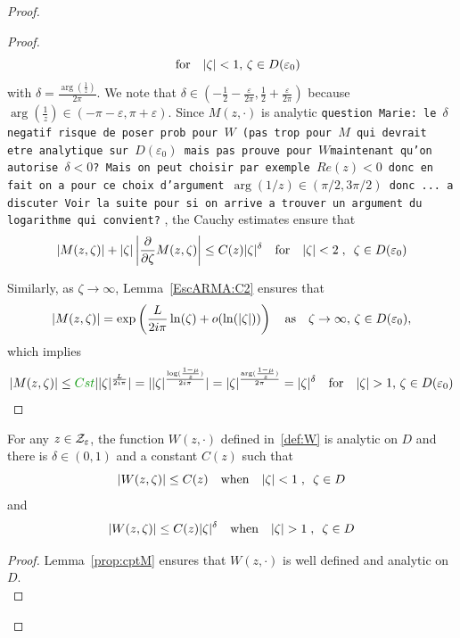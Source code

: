\documentclass[11pt]{amsart}
\newcommand{\MD}{\color{vert}}
\newcommand{\ep}{\varepsilon}
\newcommand{\f}{\frac}
\begin{document}
\begin{proof}
\begin{proof}
$$\quad \text{for} \quad  \vert \zeta \vert < 1,\, \zeta \in D(\varepsilon_0)$$ with 
 $\delta = \frac{\arg(\frac{1}{z})}{2\pi}$. We note that {\MD $\delta \in (-\f{1}{2}-\f{\ep}{2\pi},\f{1}{2}+\f{\ep}{2\pi})$ because $\arg(\frac{1}{z}) \in (-\pi-\ep, \pi+\ep)$}.
Since {\MD $M(z, \cdot)$ is analytic {\tt question Marie: le $\delta$ negatif risque de poser prob pour $W$ (pas trop pour $M$ qui devrait etre analytique  sur $D(\ep_0)$ mais pas prouve pour $W$maintenant qu'on autorise $\delta<0$? Mais on peut choisir par exemple $Re(z)<0$ donc en fait on a pour ce choix d'argument $\arg(1/z) \in (\pi/2,3\pi/2)$ donc ... a discuter Voir la suite pour si on arrive a trouver un argument du logarithme qui convient?}} , the Cauchy estimates ensure that 
\begin{equation*}
    |M(z, \zeta)| + |\zeta|\left| \frac{\partial}{\partial \zeta}M(z,\zeta)\right|
    \leq 
    C(z) |\zeta|^\delta \quad \text{for} \quad |\zeta| < 2 \; , \enspace \zeta \in D(\varepsilon_0)
\end{equation*}

Similarly, as $\zeta \to \infty$, Lemma~\ref{EscARMA:C2} ensures that 
\begin{align*}
    |M(z, \zeta)| 
    = 
    \exp\left(\frac{L}{2i\pi } \ln(\zeta) + o(\ln(|\zeta|)) \right)  \quad \text{as} \quad \zeta\to \infty,\, \zeta \in D(\varepsilon_0),
\end{align*}
which implies 
$$ \vert {M(z,\zeta)}{} \vert \leq {\MD Cst }\vert {|\zeta|^{\frac{L}{2i\pi}}}\vert=
\vert |\zeta|^{\frac{\log(\frac{1-\mu}{z})}{2i\pi}}\vert = \vert \zeta \vert^{\frac{\arg (\frac{1-\mu}{z})}{2\pi}}=\vert \zeta \vert^\delta
\mtext{for}  \vert \zeta \vert > 1,\, \zeta \in D(\varepsilon_0)$$
\end{proof}

\begin{lemma}\label{lm:cptW}For any $z \in \mathcal{Z}_\varepsilon$, the function $W(z, \cdot)$ defined in~\eqref{def:W} is analytic on $D$ and there is $\delta \in (0,1)$ and a constant $C(z)$ such that
    $$ |W(z, \zeta)| \leq C(z) 
    \quad \text{when} \quad |\zeta| < 1 \; , \enspace \zeta \in D$$
    and 
    $$ |W(z, \zeta)| \leq C(z)|\zeta|^\delta \quad \text{when} \quad |\zeta| > 1 \; , \enspace \zeta \in D$$
\end{lemma}
\begin{proof}Lemma~\ref{prop:cptM} ensures that $W(z,\cdot)$ is well defined and analytic on $D$.\\


\end{proof}
\end{proof}
\end{document}
